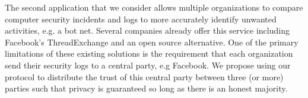The second application that we consider allows multiple organizations to compare computer security incidents and logs to more accurately identify unwanted activities, e.g. a bot net. Several companies already offer this service including Facebook's ThreadExchange\cite{threat} and an open source alternative\cite{alt_threat}. One of the primary limitations of these existing solutions is the requirement that each organization send their security logs to a central party, e.g Facebook. We propose using our protocol to distribute the trust of this central party between three (or more) parties such that privacy is guaranteed so long as there is an honest majority.



